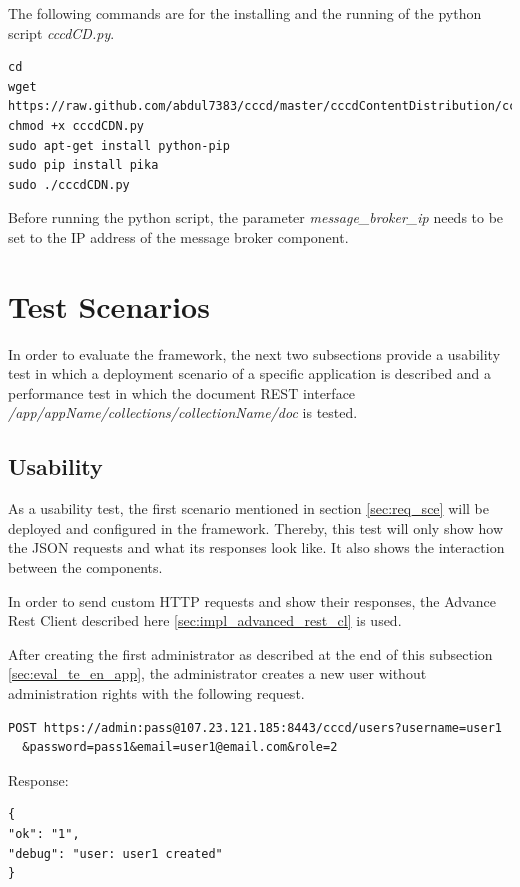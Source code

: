 The following commands are for the installing and the running of the python script \textit{cccdCD.py}.

\begin{code}
\begin{verbatim}
cd
wget https://raw.github.com/abdul7383/cccd/master/cccdContentDistribution/cccdCDN.py
chmod +x cccdCDN.py
sudo apt-get install python-pip
sudo pip install pika
sudo ./cccdCDN.py
\end{verbatim}
\end{code}

Before running the python script, the parameter \textit{message\_broker\_ip} needs to be set to the IP address of the message broker component.

\section{Test Scenarios\label{sec:eval__te_sc}}
In order to evaluate the framework, the next two subsections provide a usability test in which a deployment scenario of a specific application is described and a performance test in which the document REST interface \textit{/app/{appName}/collections/{collectionName}/doc} is tested.

\subsection{Usability\label{seq:eval_usab}}
As a usability test, the first scenario mentioned in section \ref{sec:req_sce} will be deployed and configured in the framework. Thereby, this test will only show how the \ac{JSON} requests and what its responses look like. It also shows the interaction between the components.

In order to send custom \ac{HTTP} requests and show their responses, the Advance Rest Client described here \ref{sec:impl_advanced_rest_cl} is used.

After creating the first administrator as described at the end of this subsection \ref{sec:eval_te_en_app}, the administrator creates a new user without administration rights with the following request.
\begin{code}
\begin{verbatim}
POST https://admin:pass@107.23.121.185:8443/cccd/users?username=user1
  &password=pass1&email=user1@email.com&role=2
\end{verbatim}
Response:
\begin{verbatim}
{
"ok": "1",
"debug": "user: user1 created"
}
\end{verbatim}
\end{code}

